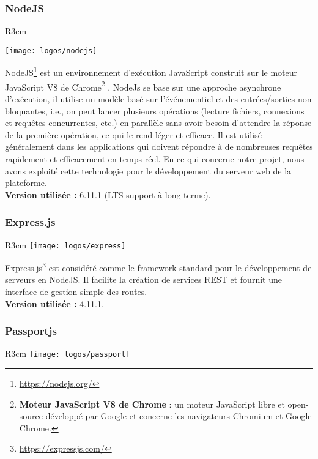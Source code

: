 \subsubsection{NodeJS} 
\begin{wrapfigure}{R}{3cm}	\vspace{-20px}
	
	\texttt{[image: logos/nodejs]}
\end{wrapfigure} 
NodeJS\footnote{\href{https://nodejs.org/fr/}{https://nodejs.org/}} est un environnement d’exécution JavaScript construit sur le moteur JavaScript V8 de Chrome\footnote{\textbf{Moteur JavaScript V8 de Chrome }: un moteur JavaScript libre et open-source développé par Google et concerne les navigateurs Chromium et Google Chrome.} . NodeJs se base sur une approche asynchrone d’exécution, il utilise un modèle basé sur l’événementiel et des entrées/sorties non bloquantes, i.e., on peut lancer plusieurs opérations (lecture fichiers, connexions et requêtes concurrentes, etc.) en parallèle sans avoir besoin d’attendre la réponse de la première opération, ce qui le rend léger et efficace. Il est utilisé généralement dans les applications qui doivent répondre à de nombreuses requêtes rapidement et efficacement en temps réel.
En ce qui concerne notre projet, nous avons exploité cette technologie pour le développement du serveur web de la plateforme.
\\
\textbf{Version utilisée :} 6.11.1 (LTS support à long terme).
\subsubsection{Express.js }
\begin{wrapfigure}{R}{3cm}	\vspace{-20px}
	\texttt{[image: logos/express]}
\end{wrapfigure} 
Express.js\footnote{\href{https://expressjs.com/}{https://expressjs.com/}} est considéré comme le framework standard pour le développement de serveurs en NodeJS. Il facilite la création de services REST et fournit une interface de gestion simple des routes.\\
\textbf{Version utilisée :} 4.11.1.
\subsubsection{Passportjs}
\begin{wrapfigure}{R}{3cm}	\vspace{-20px}
	\texttt{[image: logos/passport]}
\end{wrapfigure} 


